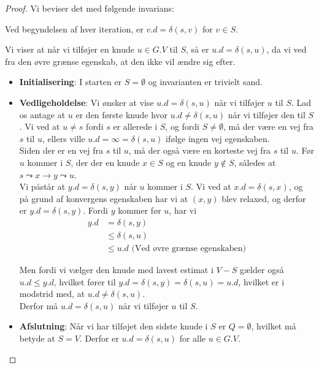 \begin{proof}
  Vi beviser det med følgende invarians:\\
  \begin{center}
    Ved begyndelsen af hver iteration, er $v.d = \delta(s,v)$ for $v \in S$.
  \end{center}

  Vi viser at når vi tilføjer en knude $u \in G.V$ til $S$, så er $u.d = \delta(s,u)$, da vi ved fra den øvre grænse egenskab, at den ikke vil ændre sig efter.\\

  \begin{itemize}
  \item \textbf{Initialisering}: I starten er $S=\emptyset$ og invarianten er trivielt sand.
  \item \textbf{Vedligeholdelse}: Vi ønsker at vise $u.d = \delta(s,u)$ når vi tilføjer $u$ til $S$. Lad os antage at $u$ er den første knude hvor $u.d \neq \delta(s,u)$ når vi tilføjer den til $S$. Vi ved at $u \neq s$ fordi $s$ er allerede i $S$, og fordi $S \neq \emptyset$, må der være en vej fra $s$ til $u$, ellers ville $u.d = \infty = \delta(s,u)$ ifølge ingen vej egenskaben.\\

    Siden der er en vej fra $s$ til $u$, må der også være en korteste vej fra $s$ til $u$. Før $u$ kommer i $S$, der der en knude $x \in S$ og en knude $y \not\in S$, således at $s \leadsto x \rightarrow y \leadsto u$.\\
    Vi påstår at $y.d = \delta(s,y)$ når $u$ kommer i $S$. Vi ved at $x.d = \delta(s,x)$, og på grund af konvergens egenskaben har vi at $(x,y)$ blev relaxed, og derfor er $y.d = \delta(s,y)$. Fordi $y$ kommer før $u$, har vi
    \begin{align*}
      y.d &= \delta(s,y)\\
          &\leq \delta(s,u)\\
          &\leq u.d \text{ (Ved øvre grænse egenskaben)}
    \end{align*}

    Men fordi vi vælger den knude med lavest estimat i $V-S$ gælder også $u.d \leq y.d$, hvilket fører til $y.d = \delta(s,y) = \delta(s,u) = u.d$, hvilket er i modstrid med, at $u.d \neq \delta(s,u)$.\\
    Derfor må $u.d = \delta(s,u)$ når vi tilføjer $u$ til $S$.
    \item \textbf{Afslutning}: Når vi har tilføjet den sidste knude i $S$ er $Q=\emptyset$, hvilket må betyde at $S = V$. Derfor er $u.d = \delta(s,u)$ for alle $u \in G.V$.
  \end{itemize}
\end{proof}

